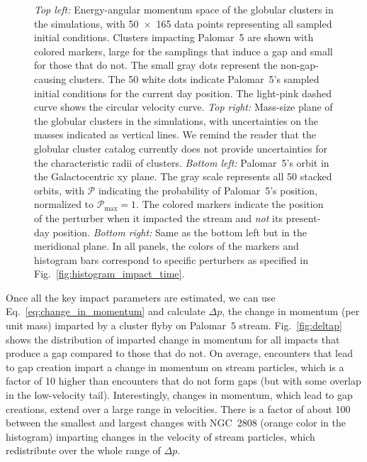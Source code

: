 \begin{figure}
            \caption{\textit{Top left:} Energy-angular momentum space of the globular clusters in the simulations, with 50~$\times$~165 data points representing all sampled initial conditions. Clusters impacting Palomar~5 are shown with colored markers, large for the samplings that induce a gap and small for those that do not. The small gray dots represent the non-gap-causing clusters. The 50 white dots indicate Palomar~5's sampled initial conditions for the current day position. The light-pink dashed curve shows the circular velocity curve. \textit{Top right:} Mass-size plane of the globular clusters in the simulations, with uncertainties on the masses indicated as vertical lines. We remind the reader that the globular cluster catalog currently does not provide uncertainties for the characteristic radii of clusters. \textit{Bottom left:} Palomar~5's orbit in the Galactocentric xy plane. The gray scale represents all 50 stacked orbits, with $\mathcal{P}$ indicating the probability of Palomar~5's position, normalized to $\mathcal{P}_\mathrm{max}=1$. The colored markers indicate the position of the perturber when it impacted the stream and \textit{not} its present-day position. \textit{Bottom right:} Same as the bottom left but in the meridional plane. In all panels, the colors of the markers and histogram bars correspond to specific perturbers as specified in Fig.~\ref{fig:histogram_impact_time}.}
            \label{fig:mass_size_plane}
        \end{figure}        
      
        Once all the key impact parameters are estimated, we can use Eq.~\ref{eq:change_in_momentum} and calculate $\Delta p$, the change in momentum (per unit mass) imparted by a cluster flyby on Palomar~5 stream. Fig.~\ref{fig:deltap} shows the distribution of imparted change in momentum for all impacts that produce a gap compared to those that do not. On average, encounters that lead to gap creation impart a change in momentum on stream particles, which is a factor of 10 higher than encounters that do not form gaps (but with some overlap in the low-velocity tail). Interestingly, changes in momentum, which lead to gap creations, extend over a large range in velocities. There is a factor of about 100 between the smallest and largest changes with NGC~2808 (orange color in the histogram) imparting changes in the velocity of stream particles, which redistribute over the whole range of $\Delta p$. 

